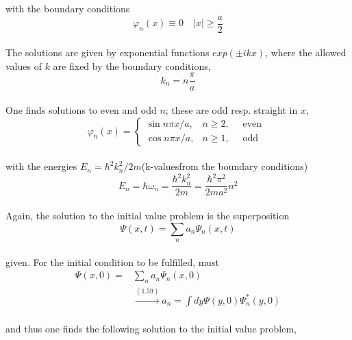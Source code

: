 with the boundary conditions
\\
\begin{equation}
\varphi_{n}(x) \equiv 0 \quad|x| \geq \frac{a}{2}
\end{equation}\\
The solutions are given by exponential functions $exp (\pm ikx)$, where
the allowed values ​​of $k$ are fixed by the boundary conditions,
\\\begin{equation}
k_{n}=n \frac{\pi}{a}
\end{equation}
\\
One finds solutions to even and odd $n$; these are odd resp.
straight in $x$,
\\
\begin{equation}
\varphi_{n}(x)=\left\{\begin{array}{ll}{\sin n \pi x / a,} & {n \geq 2, \quad \text { even }} \\ {\cos n \pi x / a,} & {n \geq 1, \quad \text { odd }}\end{array}\right.
\end{equation}\\
with the energies $E_n=\hbar^2 k_n^2/2m$(k-values ​​from the boundary conditions)
\\
\begin{equation}
E_{n}=\hbar \omega_{n}=\frac{\hbar^{2} k_{n}^{2}}{2 m}=\frac{\hbar^{2} \pi^{2}}{2 m a^{2}} n^{2}
\end{equation}\\
Again, the solution to the initial value problem is the superposition
\\
\begin{equation}
\Psi(x, t)=\sum_{n} a_{n} \Psi_{n}(x, t)
\end{equation}\\
given. For the initial condition to be fulfilled, must
\\
\begin{equation}
\begin{aligned} \Psi(x, 0)=& \sum_{n} a_{n} \Psi_{n}(x, 0) \\ & \stackrel{(1.59)}{\longrightarrow} a_{n}=\int d y \Psi(y, 0) \Psi_{n}^{*}(y, 0) \end{aligned}
\end{equation}\\
and thus one finds the following solution to the initial value problem,
\\
